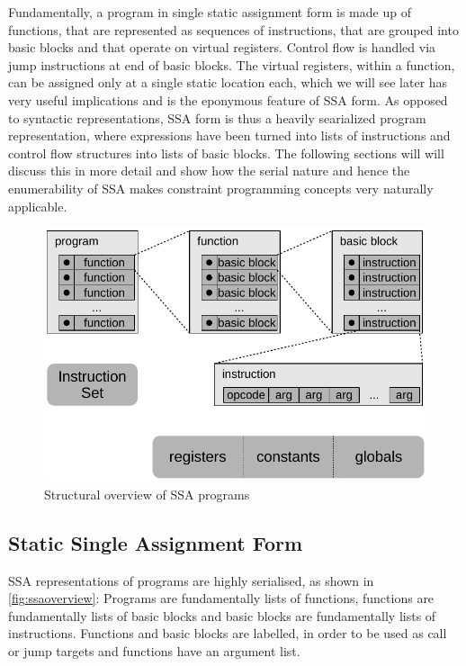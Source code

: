     Fundamentally, a program in single static assignment form is made up of
    functions, that are represented as sequences of instructions, that are
    grouped into basic blocks and that operate on virtual registers.
    Control flow is handled via jump instructions at end of basic blocks.
    The virtual registers, within a function, can be assigned only at a single
    static location each, which we will see later has very useful implications
    and is the eponymous feature of SSA form.
    As opposed to syntactic representations, SSA form is thus a heavily
    searialized program representation, where expressions have been turned into
    lists of instructions and control flow structures into lists of basic
    blocks.
    The following sections will will discuss this in more detail and show how
    the serial nature and hence the enumerability of SSA makes constraint
    programming concepts very naturally applicable.

\begin{figure}[t]
\includegraphics[width=\columnwidth]{figures/ssaoverview}
\caption{Structural overview of SSA programs}
\label{fig:ssaoverview}
\end{figure}

\subsection{Static Single Assignment Form}

    SSA representations of programs are highly serialised, as shown in
    \autoref{fig:ssaoverview}:
    Programs are fundamentally lists of functions, functions are fundamentally
    lists of basic blocks and basic blocks are fundamentally lists of
    instructions.
    Functions and basic blocks are labelled, in order to be used as call or jump
    targets and functions have an argument list.

